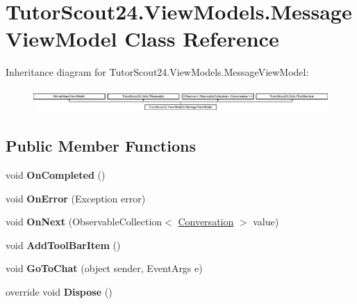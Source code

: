 \hypertarget{class_tutor_scout24_1_1_view_models_1_1_message_view_model}{}\section{Tutor\+Scout24.\+View\+Models.\+Message\+View\+Model Class Reference}
\label{class_tutor_scout24_1_1_view_models_1_1_message_view_model}
Inheritance diagram for Tutor\+Scout24.\+View\+Models.\+Message\+View\+Model\+:\begin{figure}[H]
\begin{center}
\leavevmode
\includegraphics[height=0.883281cm]{class_tutor_scout24_1_1_view_models_1_1_message_view_model}
\end{center}
\end{figure}
\subsection*{Public Member Functions}
\begin{DoxyCompactItemize}
\item 
\mbox{\label{class_tutor_scout24_1_1_view_models_1_1_message_view_model_a06987f821333acaf2713b148c223fe1f}} 
void {\bfseries On\+Completed} ()
\item 
\mbox{\label{class_tutor_scout24_1_1_view_models_1_1_message_view_model_a84ec0a4c1d4bee04c954cadc22cb5e20}} 
void {\bfseries On\+Error} (Exception error)
\item 
\mbox{\label{class_tutor_scout24_1_1_view_models_1_1_message_view_model_a0de1ad9d37b2e65c47a2de4bd8df558a}} 
void {\bfseries On\+Next} (Observable\+Collection$<$ \mbox{\hyperlink{class_tutor_scout24_1_1_models_1_1_chat_1_1_conversation}{Conversation}} $>$ value)
\item 
\mbox{\label{class_tutor_scout24_1_1_view_models_1_1_message_view_model_acf2f21a56736d5ee83d8b204433ef8f3}} 
void {\bfseries Add\+Tool\+Bar\+Item} ()
\item 
\mbox{\label{class_tutor_scout24_1_1_view_models_1_1_message_view_model_ad4ca19244326d28fed25ee600004c936}} 
void {\bfseries Go\+To\+Chat} (object sender, Event\+Args e)
\item 
\mbox{\label{class_tutor_scout24_1_1_view_models_1_1_message_view_model_a1be73e30fc8d2bfab1cb2b0fcec03a05}} 
override void {\bfseries Dispose} ()
\end{DoxyCompactItemize}
